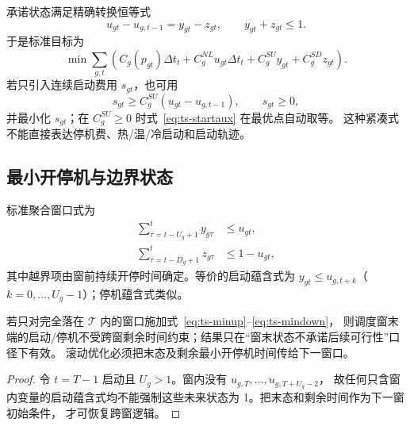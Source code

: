 承诺状态满足精确转换恒等式
\begin{equation}
u_{gt}-u_{g,t-1}=y_{gt}-z_{gt},\qquad y_{gt}+z_{gt}\le1.\label{eq:ts-logic}
\end{equation}
于是标准目标为
\begin{equation}
\min\sum_{g,t}\left(C_g(p_{gt})\Delta t_t+C_g^{NL}u_{gt}\Delta t_t
+C_g^{SU}y_{gt}+C_g^{SD}z_{gt}\right).\label{eq:ts-uc-obj}
\end{equation}
若只引入连续启动费用 $s_{gt}$，也可用
\begin{equation}
s_{gt}\ge C_g^{SU}(u_{gt}-u_{g,t-1}),\qquad s_{gt}\ge0,\label{eq:ts-startaux}
\end{equation}
并最小化 $s_{gt}$；在 $C_g^{SU}\ge0$ 时式~\eqref{eq:ts-startaux} 在最优点自动取等。
这种紧凑式不能直接表达停机费、热/温/冷启动和启动轨迹。

\subsection{最小开停机与边界状态}
标准聚合窗口式为
\begin{align}
\sum_{\tau=t-U_g+1}^{t}y_{g\tau}&\le u_{gt},\label{eq:ts-minup}\\
\sum_{\tau=t-D_g+1}^{t}z_{g\tau}&\le1-u_{gt},\label{eq:ts-mindown}
\end{align}
其中越界项由窗前持续开停时间确定。等价的启动蕴含式为
$y_{gt}\le u_{g,t+k}$（$k=0,\ldots,U_g-1$）；停机蕴含式类似。

\begin{proposition}[时域截断的必要性]\label{prop:ts-boundary}
若只对完全落在 $\mathcal T$ 内的窗口施加式~\eqref{eq:ts-minup}--\eqref{eq:ts-mindown}，
则调度窗末端的启动/停机不受跨窗剩余时间约束；结果只在“窗末状态不承诺后续可行性”口径下有效。
滚动优化必须把末态及剩余最小开停机时间传给下一窗口。
\end{proposition}
\begin{proof}
令 $t=T-1$ 启动且 $U_g>1$。窗内没有 $u_{g,T},\ldots,u_{g,T+U_g-2}$，
故任何只含窗内变量的启动蕴含式均不能强制这些未来状态为 1。把末态和剩余时间作为下一窗初始条件，
才可恢复跨窗逻辑。
\end{proof}

